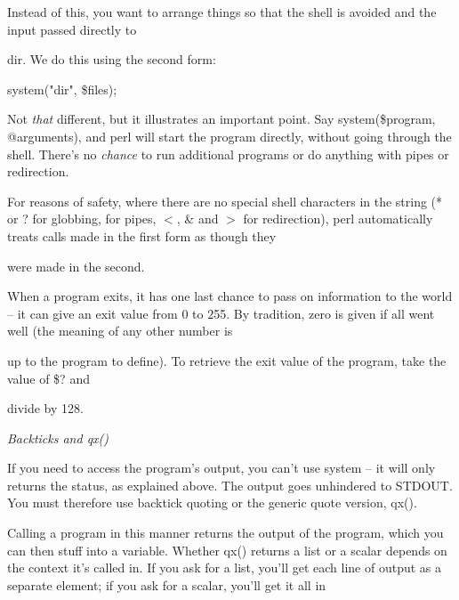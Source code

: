 \documentclass[a4paper,11pt]{book}
\begin{document}
\noindent 

\noindent Instead of this, you want to arrange things so that the shell is avoided and the input passed directly to

\noindent dir. We do this using the second form:

\noindent 

\noindent system("dir", \$files);

\noindent 

\noindent Not \textit{that }different, but it illustrates an important point. Say system(\$program, @arguments), and perl will start the program directly, without going through the shell. There's no \textit{chance }to run additional programs or do anything with pipes or redirection.

\noindent 

\noindent For reasons of safety, where there are no special shell characters in the string (* or ? for globbing, \textbar  for pipes, $<$, \& and $>$ for redirection), perl automatically treats calls made in the first form as though they

\noindent were made in the second.

\noindent 

\noindent When a program exits, it has one last chance to pass on information to the world -- it can give an exit value from 0 to 255. By tradition, zero is given if all went well (the meaning of any other number is

\noindent up to the program to define). To retrieve the exit value of the program, take the value of \$? and

\noindent divide by 128.

\noindent 

\noindent 

\noindent \textit{Backticks and qx()}

\noindent If you need to access the program's output, you can't use system -- it will only returns the status, as explained above. The output goes unhindered to STDOUT. You must therefore use backtick quoting or the generic quote version, qx().

\noindent 

\noindent Calling a program in this manner returns the output of the program, which you can then stuff into a variable. Whether qx() returns a list or a scalar depends on the context it's called in. If you ask for a list, you'll get each line of output as a separate element; if you ask for a scalar, you'll get it all in
\end{document}
